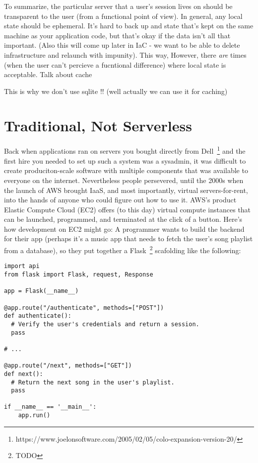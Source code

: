 \documentclass{article}
\newcommand{\newp}{\newline\indent}
\begin{document}
To summarize, the particular server that a user's session lives on should be transparent to the user (from a functional point of view).
In general, any local state should be ephemeral.
It's hard to back up and state that's kept on the same machine as your application code, but that's okay if the data isn't all that important.
(Also this will come up later in IaC - we want to be able to delete infrastructure and relaunch with impunity).
This way, 
However, there \textit{are} times (when the user can't percieve a fucntional difference) where local state is acceptable.
Talk about cache

This is why we don't use sqlite !! (well actually we can use it for caching)

\section{Traditional, Not Serverless}

Back when applications ran on servers you bought directly from Dell~\footnote{https://www.joelonsoftware.com/2005/02/05/colo-expansion-version-20/} and the first hire you needed to set up such a system was a sysadmin, it was difficult to create produciton-scale software with multiple components that was available to everyone on the internet.
Nevertheless people persevered, until the 2000s when the launch of AWS brought IaaS, and most importantly, virtual servers-for-rent, into the hands of anyone who could figure out how to use it.
AWS's product Elastic Compute Cloud (EC2) offers (to this day) virtual compute instances that can be launched, programmed, and terminated at the click of a button.
Here's how development on EC2 might go:
\newp A programmer wants to build the backend for their app (perhaps it's a music app that needs to fetch the user's song playlist from a database), so they put together a Flask~\footnote{TODO} scafolding like the following:

\begin{verbatim}
import api
from flask import Flask, request, Response

app = Flask(__name__)

@app.route("/authenticate", methods=["POST"])
def authenticate():
  # Verify the user's credentials and return a session.
  pass

# ...

@app.route("/next", methods=["GET"])
def next():
  # Return the next song in the user's playlist.
  pass

if __name__ == '__main__':
    app.run()
\end{verbatim}
\end{document}
